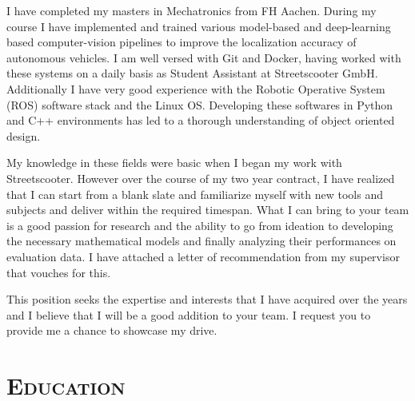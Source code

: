\documentclass[11pt,a4paper,roman]{moderncv} %
\begin{document}
I have completed my masters in Mechatronics from FH Aachen. During my course I have implemented and trained various model-based and 
deep-learning based computer-vision pipelines to improve the localization accuracy of autonomous vehicles. I am well versed with Git and Docker, 
having worked with these systems on a daily basis as Student Assistant at Streetscooter GmbH. Additionally I have very good experience with the Robotic Operative System (ROS) software stack 
and the Linux OS. Developing these softwares in Python and C++ environments has led to a thorough understanding of object oriented design.
    
My knowledge in these fields were basic when I began my work with Streetscooter. However over the course of my two year contract, 
I have realized that I can start from a blank slate and familiarize myself with new tools and subjects and deliver within the required timespan. What I can bring to your team is a 
good passion for research and the ability to go from ideation to developing the necessary mathematical models 
and finally analyzing their performances on evaluation data. I have attached a letter of recommendation from my supervisor that vouches for this.

This position seeks the expertise and interests that I have acquired over the years and I believe that I will be a good addition to your team. 
I request you to provide me a chance to showcase my drive.   

\vspace{20pt}
\makeletterclosing %





\newpage

%

\makecvtitle %


\section{\scshape{\huge Education}}
\end{document}
